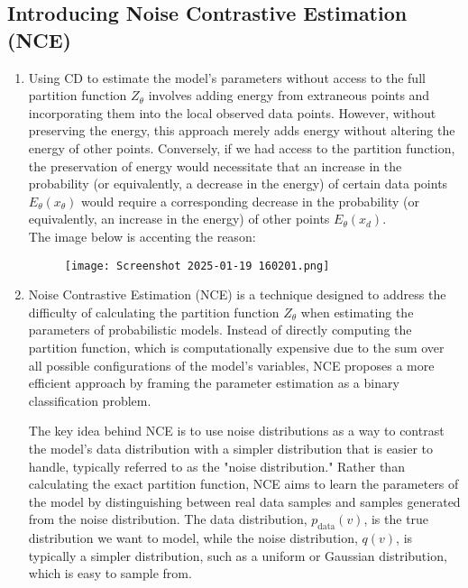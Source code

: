 \documentclass{article}
\begin{document}
\subsection{Introducing Noise Contrastive Estimation (NCE)}
\begin{enumerate}
    \item
Using CD to estimate the model's parameters without access to the full partition function \( Z_\theta \) involves adding energy from extraneous points and incorporating them into the local observed data points. However, without preserving the energy, this approach merely adds energy without altering the energy of other points. Conversely, if we had access to the partition function, the preservation of energy would necessitate that an increase in the probability (or equivalently, a decrease in the energy) of certain data points \( E_\theta(x_\theta) \) would require a corresponding decrease in the probability (or equivalently, an increase in the energy) of other points \( E_\theta(x_d) \).
\\
The image below is accenting the reason:
\begin{figure}[h!]
        \centering
        \texttt{[image: Screenshot 2025-01-19 160201.png]} %
        \label{fig:gr1}
    \end{figure} 
\item 

Noise Contrastive Estimation (NCE) is a technique designed to address the difficulty of calculating the partition function \( Z_\theta \) when estimating the parameters of probabilistic models. Instead of directly computing the partition function, which is computationally expensive due to the sum over all possible configurations of the model's variables, NCE proposes a more efficient approach by framing the parameter estimation as a binary classification problem.

The key idea behind NCE is to use noise distributions as a way to contrast the model's data distribution with a simpler distribution that is easier to handle, typically referred to as the "noise distribution." Rather than calculating the exact partition function, NCE aims to learn the parameters of the model by distinguishing between real data samples and samples generated from the noise distribution. The data distribution, \( p_{\text{data}}(v) \), is the true distribution we want to model, while the noise distribution, \( q(v) \), is typically a simpler distribution, such as a uniform or Gaussian distribution, which is easy to sample from.


\end{enumerate}
\end{document}
